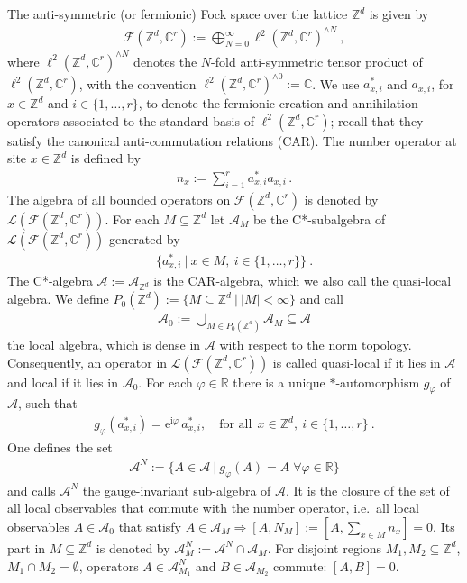 \documentclass[a4paper]{article}
\newcommand{\e}{\mathrm{e}}
\renewcommand{\i}{\mathrm{i}}
\newcommand{\fd}{r}
\newcommand{\Z}{\mathbb{Z}}
\newcommand{\C}{\mathbb{C}}
\newcommand{\mA}{\mathcal{A}}
\newcommand{\R}{\mathbb{R}}
\theoremstyle{plain}
\theoremstyle{definition}
\theoremstyle{remark}
\renewcommand{\(}{\left(}
\renewcommand{\)}{\right)}
\begin{document}
 The anti-symmetric  (or fermionic) Fock space over the lattice $\Z^d$ is given by
    \begin{align*}
       \mathcal{F}(\Z^d,\C^\fd) := \bigoplus_{N=0}^{\infty}\ell^2(\Z^d,\C^\fd)^{\wedge N} ~,
    \end{align*}
where $\ell^2(\mathbb{Z}^d, \mathbb{C}^\fd)^{\wedge N}$ denotes the $N$-fold anti-symmetric tensor product of $\ell^2(\mathbb{Z}^d, \mathbb{C}^\fd)$, with the convention $\ell^2(\mathbb{Z}^d, \mathbb{C}^\fd)^{\wedge 0} := \mathbb{C}$.
    We use $a^*_{x,i}$ and $a_{x,i}$, for $x\in \Z^d$ and $i\in \{1,\dots,\fd\}$, to denote the fermionic creation and annihilation operators associated to the standard basis of $\ell^2(\Z^d,\C^\fd)$; recall that they satisfy the canonical anti-commutation relations (CAR).
    The number operator at site $x\in\Z^d$ is defined by
    \begin{align*}
        n_x:=\sum_{i=1}^\fd a^*_{x,i}a_{x,i}\,.
    \end{align*}
    The algebra of all bounded operators on $\mathcal{F}(\Z^d,\C^\fd)$ is denoted by $ \mathcal{L}(\mathcal{F}(\Z^d,\C^\fd))$. 
    For each $M\subseteq \Z^d$ let $\mA_M$ be the C*-subalgebra of $ \mathcal{L}(\mathcal{F}(\Z^d,\C^\fd))$  generated by
    \begin{align*}
        \{a^*_{x,i}~|~x\in M,~ i\in \{1,\dots,\fd\}\}~.
    \end{align*}
    The C*-algebra $\mA := \mA_{\Z^d}$ is the CAR-algebra, which we also call the quasi-local algebra. We define $P_0(\Z^d) := \{M\subseteq \Z^d~|~|M|<\infty \}$ and call
    \begin{align*}
        \mA_0 := \bigcup_{M\in P_0(\Z^d)} \mA_M \subseteq \mA
    \end{align*}
    the local algebra, which is dense in $\mA$ with respect to the norm topology. Consequently, an operator   in $ \mathcal{L}(\mathcal{F}(\Z^d,\C^\fd))$ is called quasi-local if it lies in $\mA$ and local if it lies in $\mA_0$.
    For each $\varphi \in \R$ there is a unique $*$-automorphism $g_\varphi$ of $\mA$, such that
    \begin{align*}
        g_\varphi(a^*_{x,i}) =  \e^{\i\varphi} \, a^*_{x,i}, \quad \text{for all}~~ x\in \Z^d,~ i\in \{ 1,\dots,\fd \} ~.
    \end{align*}
One defines the set
    \begin{align*}
        \mA^N := \{A\in \mA~|~ g_\varphi (A) = A \; \forall \varphi \in \R\}
    \end{align*}
    and calls $\mA^N$ the gauge-invariant sub-algebra of $\mA$. It is the closure of the set of all local observables that commute with the number operator, i.e.\  all local observables $A\in   \mA_0$ that satisfy $A\in \mA_M \Rightarrow [A,N_M]:=[A,\sum_{x\in M}n_x]=0$.  Its part in $M\subseteq\Z^d$  is denoted by $\mA^N_M:= \mA^N\cap \mA_M$.
For disjoint regions $M_1,M_2 \subseteq\Z^d$,  $M_1\cap M_2 = \emptyset$, operators  $A\in \mA_{M_1}^N$ and $B\in \mA_{M_2}$ commute:  $[A,B] = 0$.
\end{document}
